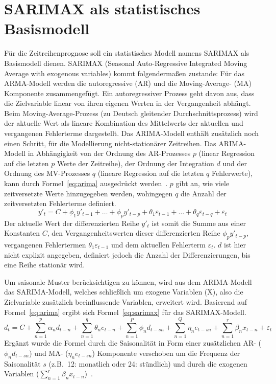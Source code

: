 \section{SARIMAX als statistisches Basismodell}
Für die Zeitreihenprognose soll ein statistisches Modell namens SARIMAX als Basismodell dienen.
SARIMAX (Seasonal Auto-Regressive Integrated Moving Average with exogenous variables) kommt folgendermaßen zustande:
Für das ARMA-Modell werden die autoregressive (AR) und die Moving-Average- (MA) Komponente zusammengefügt.
Ein autoregressiver Prozess geht davon aus, dass die Zielvariable linear von ihren eigenen Werten in der Vergangenheit abhängt.
Beim Moving-Average-Prozess (zu Deutsch gleitender Durchschnittsprozess) wird der aktuelle Wert als lineare Kombination des Mittelwerts der aktuellen und vergangenen Fehlerterme dargestellt.
Das \ac{ARIMA}-Modell enthält zusätzlich noch einen Schritt, für die Modellierung nicht-stationärer Zeitreihen.
Das ARIMA-Modell in Abhängigkeit von der Ordnung des AR-Prozesses $p$ (linear Regression auf die letzten $p$ Werte der Zeitreihe), der Ordnung der Integration $d$ und der Ordnung des MV-Prozesses $q$ (lineare Regression auf die letzten $q$ Fehlerwerte), kann durch Formel~\ref{eq:arima} ausgedrückt werden~\cite{Peixeiro.2022}.
$p$ gibt an, wie viele zeitversetzte Werte hinzugegeben werden, wohingegen $q$ die Anzahl der zeitversetzten Fehlerterme definiert.
\begin{equation}
 \label{eq:arima}
 y'_t = C + \phi_1 y'_{t-1} + \ldots + \phi_p y'_{t-p} + \theta_1 \varepsilon_{t-1} + \ldots + \theta_q \varepsilon_{t-q} + \varepsilon_t
\end{equation}
Der aktuelle Wert der differenzierten Reihe $y'_t$ ist somit die Summe aus einer Konstanten $C$, den Vergangenheitswerten dieser differenzierten Reihe $\phi_p y'_{t-p}$, vergangenen Fehlertermen $\theta_1 \varepsilon_{t-1}$ und dem aktuellen Fehlerterm $\varepsilon_t$.
$d$ ist hier nicht explizit angegeben, definiert jedoch die Anzahl der Differenzierungen, bis eine Reihe stationär wird.

Um saisonale Muster berücksichtigen zu können, wird aus dem \ac{ARIMA}-Modell das SARIMA-Modell, welches schließlich um exogene Variablen (X), also die Zielvariable zusätzlich beeinflussende Variablen, erweitert wird.
Basierend auf Formel~\ref{eq:arima} ergibt sich Formel~\ref{eq:sarimax} für das SARIMAX-Modell.
\begin{equation}
 \label{eq:sarimax}
 d_t = C + \sum_{n=1}^{p} \alpha_n d_{t-n} + \sum_{n=1}^{q} \theta_n e_{t-n} + \sum_{n=1}^{P} \phi_n d_{t-sn} + \sum_{n=1}^{Q} \eta_n e_{t-sn} + \sum_{n=1}^{r} \beta_n x_{t-n} + \varepsilon_t
\end{equation}
Ergänzt wurde die Formel durch die Saisonalität in Form einer zusätzlichen AR- ($\phi_n d_{t-sn}$) und MA- ($\eta_n e_{t-sn}$) Komponente verschoben um die Frequenz der Saisonalität $s$ (z.B.\ 12: monatlich oder 24: stündlich) und durch die exogenen Variablen ($\sum_{n=1}^{r} \beta_n x_{t-n}$)~\cite{Artley.26.4.2022}.


